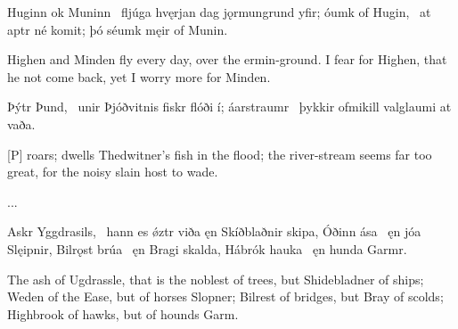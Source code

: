 \bvg
\bva Huginn ok Muninn \hld\ fljúga hvęrjan dag
\ind jǫrmungrund yfir;
óumk of Hugin, \hld\ at aptr né komit;
\ind þó séumk męir of Munin.\eva

\bvb Highen and Minden fly every day, over the ermin-ground. I fear for Highen, that he not come back, yet I worry more for Minden.\evb
\evg


\bvg
\bva Þýtr Þund, \hld\ unir Þjóðvitnis
\ind fiskr flóði í;
áarstraumr \hld\ þykkir ofmikill
\ind valglaumi at vaða.\eva

\bvb {}[P] roars; dwells Thedwitner’s fish in the flood; the river-stream seems far too great, for the noisy slain host to wade.\evb
\evg


...


\bvg
\bva Askr Yggdrasils, \hld\ hann es ǿztr viða
\ind ęn Skíðblaðnir skipa,
Óðinn ása \hld\ ęn jóa Slęipnir,
Bilrǫst brúa \hld\ ęn Bragi skalda,
Hábrók hauka \hld\ ęn hunda Garmr.\eva

\bvb The ash of Ugdrassle, that is the noblest of trees, but Shidebladner of ships; Weden of the Ease, but of horses Slopner; Bilrest of bridges, but Bray of scolds; Highbrook of hawks, but of hounds Garm.\evb
\evg
